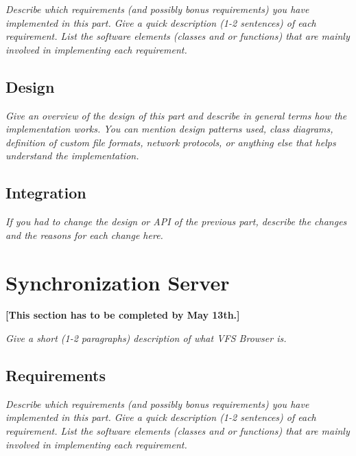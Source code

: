 \documentclass[a4paper,12pt]{article}
\begin{document}
\emph{Describe which requirements (and possibly bonus requirements) you have implemented in this part. Give a quick description (1-2 sentences) of each requirement. List the software elements (classes and or functions) that are mainly involved in implementing each requirement.}


\subsection{Design}

\emph{Give an overview of the design of this part and describe in general terms how the implementation works. You can mention design patterns used, class diagrams, definition of custom file formats, network protocols, or anything else that helps understand the implementation.}


\subsection{Integration}

\emph{If you had to change the design or API of the previous part, describe the changes and the reasons for each change here.}




\section{Synchronization Server}

\textbf{[This section has to be completed by May 13th.]}

\emph{Give a short (1-2 paragraphs) description of what VFS Browser is.}


\subsection{Requirements}

\emph{Describe which requirements (and possibly bonus requirements) you have implemented in this part. Give a quick description (1-2 sentences) of each requirement. List the software elements (classes and or functions) that are mainly involved in implementing each requirement.}
\end{document}
